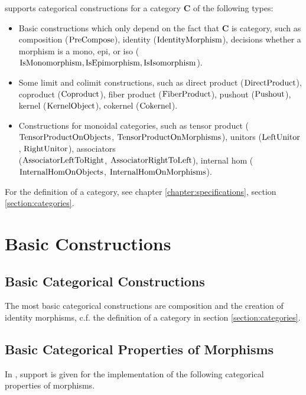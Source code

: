 \CapPkg supports categorical constructions 
for a category $\mathbf{C}$
of the following types:

\begin{itemize}
 \item Basic constructions which only depend on the fact that $\mathbf{C}$ is category,
 such as composition ($\mathrm{PreCompose}$), identity ($\mathrm{IdentityMorphism}$), decisions whether
 a morphism is a mono, epi, or iso ($\mathrm{IsMonomorphism}, \mathrm{IsEpimorphism}, \mathrm{IsIsomorphism}$).
 \item Some limit and colimit constructions, such as direct product ($\mathrm{DirectProduct}$),
 coproduct ($\mathrm{Coproduct}$), fiber product ($\mathrm{FiberProduct}$), pushout ($\mathrm{Pushout}$),
 kernel ($\mathrm{KernelObject}$), cokernel ($\mathrm{Cokernel}$).
 \item Constructions for monoidal categories, such as tensor product ($\mathrm{TensorProductOnObjects}$, $\mathrm{TensorProductOnMorphisms}$),
 unitors ($\mathrm{LeftUnitor}$, $\mathrm{RightUnitor}$), associators \\($\mathrm{AssociatorLeftToRight}$, $\mathrm{AssociatorRightToLeft}$),
 internal hom ($\mathrm{InternalHomOnObjects}$, $\mathrm{InternalHomOnMorphisms}$).
\end{itemize}

\begin{notation}
 For the definition of a category, see chapter \ref{chapter:specifications}, section \ref{section:categories}.
\end{notation}


\section{Basic Constructions}

\subsection{Basic Categorical Constructions}

The most basic categorical constructions are composition and the creation
of identity morphisms, c.f. the definition of a \CapPkg category in section \ref{section:categories}.

\subsection{Basic Categorical Properties of Morphisms}

In \CapPkg, support is given for the implementation of the following categorical properties
of morphisms.


